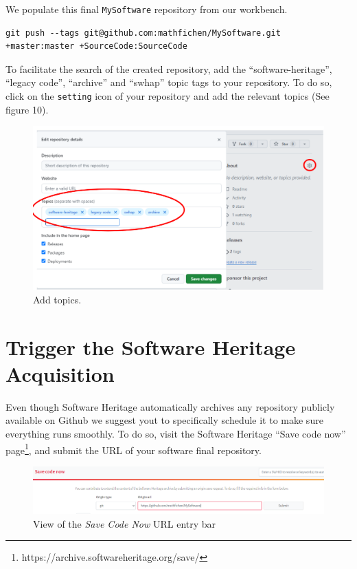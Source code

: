 \documentclass[]{article}
\newcommand{\passthrough}[1]{#1}
\begin{document}
We populate this final \passthrough{\lstinline!MySoftware!} repository
from our workbench.

\begin{lstlisting}
git push --tags git@github.com:mathfichen/MySoftware.git +master:master +SourceCode:SourceCode
\end{lstlisting}

To facilitate the search of the created repository, add the
``software-heritage'', ``legacy code'', ``archive'' and ``swhap'' topic
tags to your repository. To do so, click on the
\passthrough{\lstinline!setting!} icon of your repository and add the
relevant topics (See figure 10).

\begin{figure}
\hypertarget{fig:Topics}{%
\centering
\includegraphics{./media2/18_tags.png}
\caption{Add topics.}\label{fig:Topics}
}
\end{figure}

\hypertarget{sec:archive}{%
\section{Trigger the Software Heritage Acquisition}\label{sec:archive}}

Even though Software Heritage automatically archives any repository
publicly available on Github we suggest yout to specifically schedule it
to make sure everything runs smoothly. To do so, visit the Software
Heritage ``Save code now'' page\footnote{https://archive.softwareheritage.org/save/},
and submit the URL of your software final repository.

\begin{figure}
\hypertarget{fig:saveCodeNowURL}{%
\centering
\includegraphics{./media2/19_savecode.png}
\caption{View of the \emph{Save Code Now} URL entry
bar}\label{fig:saveCodeNowURL}
}
\end{figure}
\end{document}
